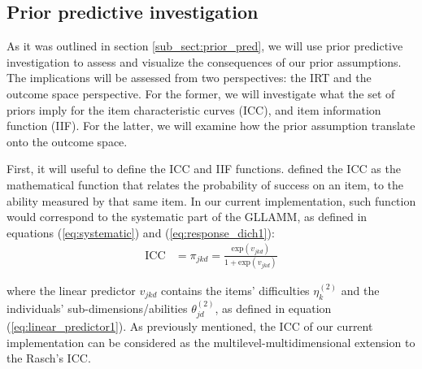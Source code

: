 \begin{comment}
On the other hand, from the texts and items perspective, at the level of the items (level-2) we would have $(25 \times 26)/2 = 325$ pieces of information available, corresponding to the variances and covariances of the items dimensions. With that information we would need to estimate $30$ parameters, corresponding to $25$ items' dimension variances, and $5$ texts' dimension variances. notice in this case, we do not need to estimate $25$ loadings, as they are assumed to be $1$.
\end{comment}


\subsection{Prior predictive investigation} \label{sub_sect:prior_pred_inv}

As it was outlined in section \ref{sub_sect:prior_pred}, we will use prior predictive investigation to assess and visualize the consequences of our prior assumptions. The implications will be assessed from two perspectives: the IRT and the outcome space perspective. For the former, we will investigate what the set of priors imply for the item characteristic curves (ICC), and item information function (IIF). For the latter, we will examine how the prior assumption translate onto the outcome space.

First, it will useful to define the ICC and IIF functions. \citet{Hambleton_et_al_1991b} defined the ICC as the mathematical function that relates the probability of success on an item, to the ability measured by that same item. In our current implementation, such function would correspond to the systematic part of the GLLAMM, as defined in equations (\ref{eq:systematic}) and (\ref{eq:response_dich1}):
%
\begin{equation} \label{eq:ICC}
	\begin{split}
		\text{ICC} &= \pi_{jkd} = \frac{ \text{exp}(v_{jkd}) }{ 1 + \text{exp}(v_{jkd}) }
	\end{split}	
\end{equation}

\noindent where the linear predictor $v_{jkd}$ contains the items' difficulties $\eta^{(2)}_{k}$ and the individuals' sub-dimensions/abilities $\theta^{(2)}_{jd}$, as defined in equation (\ref{eq:linear_predictor1}). As previously mentioned, the ICC of our current implementation can be considered as the multilevel-multidimensional extension to the Rasch's ICC.


